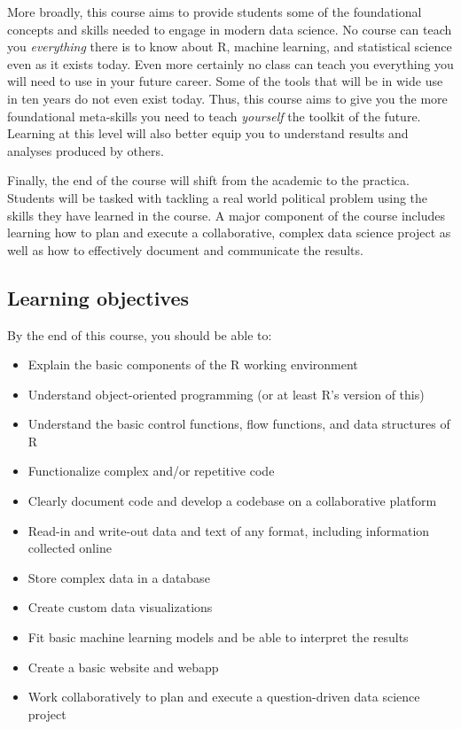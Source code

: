 \documentclass[11pt]{article}
\begin{document}
More broadly, this course aims to provide students some of
the foundational concepts and skills needed to engage in modern data
science.  No course can teach you \textit{everything} there
is to know about R, machine learning, and statistical science even as
it exists today.  Even more certainly no class can teach you everything you will need to use in your future career.  Some of the
tools that will be in wide use in ten years do not even exist today.
Thus, this course aims to give you the more foundational meta-skills
you need to teach \textit{yourself} the toolkit of the future.  Learning at this level will also better
equip you to understand results and analyses produced by others.

Finally, the end of the course will shift from the academic to the
practica.  Students will be tasked
with tackling a real world political problem using the skills they
have learned in the course. A major component of the course includes
learning how to plan and execute a collaborative, complex data science
project as well as how to effectively document and communicate the results.
 
\newpage

\subsection*{Learning objectives}

By the end of this course, you should be able to:

\begin{itemize}
\setlength\itemsep{0em}
\item Explain the basic components of the R working environment
\item Understand object-oriented programming (or at least R's version
  of this)
\item Understand the basic control functions, flow functions, and data
  structures of R
\item Functionalize complex and/or repetitive code
\item Clearly document code and develop a codebase on a collaborative platform
\item Read-in and write-out data and text of any format, including
  information collected online
\item Store complex data in a database
\item Create custom data visualizations
\item Fit basic machine learning models and be able to interpret the results
\item Create a basic website and webapp
\item Work collaboratively to plan and execute a question-driven data science project
\end{itemize}
\end{document}
